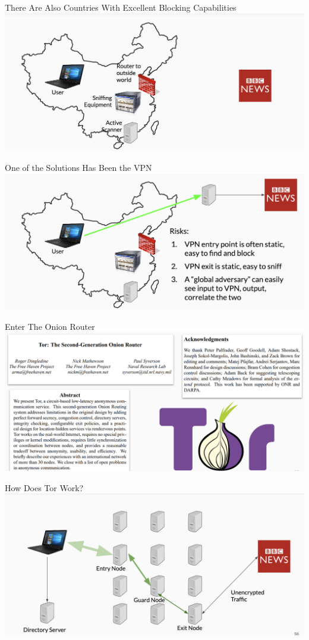 \documentclass[nobackground,dvipsnames,table,aspectratio=169]{beamer}
\begin{document}
\begin{frame}{There Are Also Countries With Excellent Blocking Capabilities}
    \includegraphics[width=\textwidth]{china-blocking-diagram}
\end{frame}

\begin{frame}{One of the Solutions Has Been the VPN}
    \includegraphics[width=\textwidth]{vpn-solution}
\end{frame}

\begin{frame}{Enter The Onion Router}
    \includegraphics[width=\textwidth]{tor}
\end{frame}

\begin{frame}{How Does Tor Work?}
    \includegraphics[width=\textwidth]{how-tor-works}
\end{frame}
\end{document}
